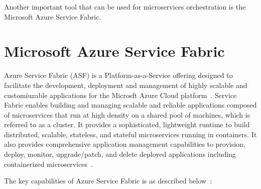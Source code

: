 Another important tool that can be used for microservices
orchestration is the Microsoft Azure Service Fabric.



\section{Microsoft Azure Service Fabric}
Azure Service Fabric (ASF) is a Platform-as-a-Service offering
designed to facilitate the development, deployment and management of
highly scalable and customiuzable applications for the Microsft Azure
Cloud platform~\cite{hid-sp18-501-definition}. Service Fabric enables
building and managing scalable and reliable applications composed of
microservices that run at high density on a shared pool of machines,
which is referred to as a cluster. It provides a sophisticated,
lightweight runtime to build distributed, scalable, stateless, and
stateful microservices running in containers. It also provides
comprehensive application management capabilities to provision,
deploy, monitor, upgrade/patch, and delete deployed applications
including containerized microservices~\cite{hid-sp18-501-overview}.

The key capabilities of Azure Service Fabric is as described
below~\cite{hid-sp18-501-overview}:

